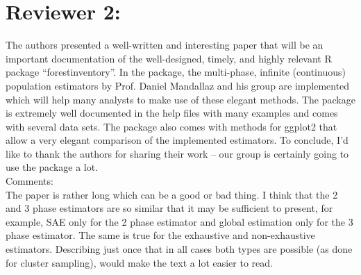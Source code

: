 \documentclass{article}
\begin{document}

\section*{Reviewer 2:}

The authors presented a well-written and interesting paper that will be an important documentation of the well-designed, timely, and highly relevant R package “forestinventory”. In the package, the multi-phase, infinite
(continuous) population estimators by Prof. Daniel Mandallaz and his group are implemented which will help many analysts to make use of these elegant methods. The package is extremely well documented in the help files with many examples and comes with several data sets. The package also comes with methods for ggplot2 that allow a very elegant comparison of the implemented estimators. To conclude, I’d like to thank the authors for sharing their work -- our group is certainly going to use the package a lot.\\


Comments:\\

The paper is rather long which can be a good or bad thing. I think that the 2 and 3 phase estimators are so similar that it may be sufficient to present, for example, SAE only for the 2 phase estimator and global estimation only for the 3 phase estimator. The same is true for the exhaustive and non-exhaustive estimators. Describing just once that in all cases both types are possible (as done for cluster sampling), would make the text a lot easier to read. \\
\\
 \\
\end{document}
